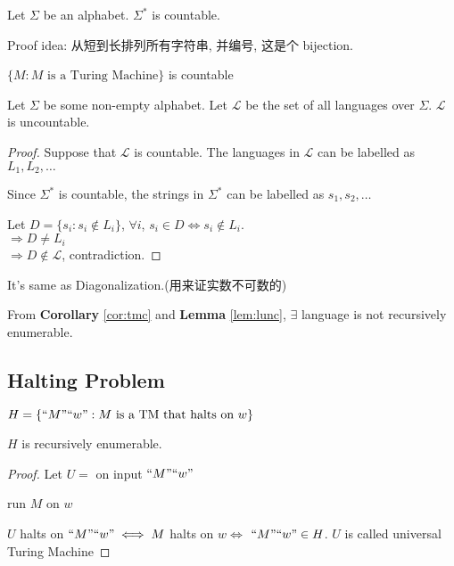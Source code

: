 \begin{lemma}
    Let $\Sigma$ be an alphabet. $\Sigma^*$ is countable. 
\end{lemma}
Proof idea: 从短到长排列所有字符串, 并编号, 这是个 bijection. 

\begin{corollary}\label{cor:tmc}
    $\{ M: M \text{ is a Turing Machine} \}$ is countable
\end{corollary}

\begin{lemma}\label{lem:lunc}
    Let $\Sigma$ be some non-empty alphabet. Let $\mathcal{L}$ be the set of all languages over $\Sigma$. $\mathcal{L}$ is uncountable. 
\end{lemma}
\begin{proof}
    Suppose that $\mathcal{L}$ is countable. The languages in $\mathcal{L}$ can be labelled as $L_1,L_2,\dots$ 
    
    Since $\Sigma^*$ is countable, the strings in $\Sigma^*$ can be labelled as $s_1,s_2,\dots$

    Let $D=\{ s_i:s_i\notin L_i \}$, $\forall i$, $s_i\in D \iff s_i\notin L_i$. \\
    $\Rightarrow D\ne L_i$\\
    $\Rightarrow D\notin \mathcal{L}$, contradiction. 
\end{proof}
It's same as Diagonalization.(用来证实数不可数的)

From \textbf{Corollary} \ref{cor:tmc} and \textbf{Lemma} \ref{lem:lunc}, $\exists$ language is not recursively enumerable. 

\subsection{Halting Problem}
$H=\{ ``M"``w": M \text{ is a TM that halts on }w \}$

\begin{theorem}
    $H$ is recursively enumerable. 
\end{theorem}
\begin{proof}
    Let $U=$ on input $``M"``w"$
    \begin{algorithm}[H]
        \caption{$U$}
        \begin{algorithmic}
            \State run $M$ on $w$
        \end{algorithmic}
    \end{algorithm}
    $U$ halts on $``M"``w"\iff M$ halts on $w \iff$ $``M"``w"\in H$. $U$ is called universal Turing Machine
\end{proof}


